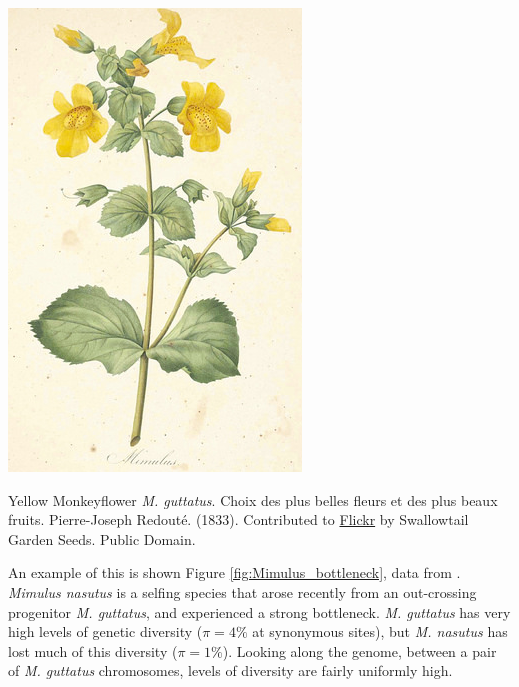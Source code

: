 \begin{marginfigure}[2cm]
\begin{center}
  \includegraphics[width = 0.75 \textwidth]{illustration_images/Genetic_drift/Mimulus/Mimulus.png}
\end{center}
\caption{Yellow Monkeyflower {\it M. guttatus}. \newline \noindent \tiny{ Choix des plus belles fleurs et des plus beaux fruits. Pierre-Joseph
  Redout\'e. (1833). Contributed to \href{https://www.flickr.com/photos/swallowtailgardenseeds/14479197839/in/photolist-o4tF54-od9My9-odbSn4-r7eVtm-qrR4xf-x4XVdi-owo7PM-r5mart-roPqqi-owrprg-qsfzJv-wMDeSy-oupCu9-oeSX38-odaeHf-ovbTTS-roEdyK-tCQBqn-odwyWa-otAUPX-oePwpE-odca2V-tBxNdi-roL99F-odbN4q-ot1HNN-ouhP5r-odcvRH-oveh86-rpAnnD-roE9j9-rowiBc-osDEHS-od7QxD-oeQ9yS-odatza-ox9fq8-oujGWa-osBqTm-ovoAKj-r5qRxT-oeRVxu-oux9q2-tMvxm3-x5pLez-owuL1t-oePFVJ-ov1yHY-oeWskU-tmeZzB}{Flickr} by Swallowtail Garden Seeds. Public Domain.}} \label{fig:monkeyflower}  %
\end{marginfigure}
An example of this is shown Figure
\ref{fig:Mimulus_bottleneck}, data from \citeauthor{brandvain:14}. {\it Mimulus nasutus} is a selfing
species that arose recently from an out-crossing progenitor {\it M.
  guttatus}, and experienced a strong bottleneck. {\it M. guttatus} has very high levels of genetic diversity
($\pi=4\%$ at synonymous sites), but {\it M. nasutus} has lost much
of this diversity ($\pi =1\%$). Looking along the genome, between a
pair of {\it M. guttatus} chromosomes, levels of
diversity are fairly uniformly high.

